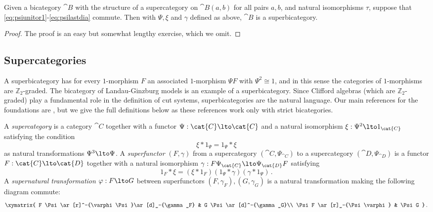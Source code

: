 \begin{lemma}\label{lemma:constructingsuper}
Given a bicategory $\cat{B}$ with the structure of a supercategory on $\cat{B}(a,b)$ for all pairs $a,b$, and natural isomorphisms $\tau$, suppose that \eqref{eq:psiunitor1}-\eqref{eq:psilastdia} commute. Then with $\Psi, \xi$ and $\gamma$ defined as above, $\cat{B}$ is a superbicategory.
\end{lemma}
\begin{proof}
The proof is an easy but somewhat lengthy exercise, which we omit.
\end{proof}

\subsection{Supercategories}

A superbicategory has for every $1$-morphism $F$ an associated $1$-morphism $\Psi F$ with $\Psi^2 \cong 1$, and in this sense the categories of $1$-morphisms are $\mathbb{Z}_2$-graded. The bicategory of Landau-Ginzburg models is an example of a superbicategory. Since Clifford algebras (which are $\mathbb{Z}_2$-graded) play a fundamental role in the definition of cut systems, superbicategories are the natural language. Our main references for the foundations are \cite{ellis_lauda,kang,kang2}, but we give the full definitions below as these references work only with strict bicategories.

\begin{definition} A \emph{supercategory} is a category $\cat{C}$ together with a functor $\Psi: \cat{C} \lto \cat{C}$ and a natural isomorphism $\xi: \Psi^2 \lto 1_{\cat{C}}$ satisfying the condition
\[
\xi * 1_{\Psi} = 1_{\Psi} * \xi
\]
as natural transformations $\Psi^3 \lto \Psi$. A \emph{superfunctor} $(F, \gamma)$ from a supercategory $(\cat{C}, \Psi_{\cat{C}})$ to a supercategory $(\cat{D}, \Psi_{\cat{D}})$ is a functor $F: \cat{C} \lto \cat{D}$ together with a natural isomorphism $\gamma: F \Psi_{\cat{C}} \lto \Psi_{\cat{D}} F$ satisfying
\[
1_F * \xi = (\xi * 1_F ) ( 1_{\Psi} * \gamma ) ( \gamma * 1_{\Psi} )\,.
\]
A \emph{supernatural transformation} $\varphi: F \lto G$ between superfunctors $(F,\gamma_F), (G,\gamma_G)$ is a natural transformation making the following diagram commute:
\[
\xymatrix{
F \Psi \ar[r]^-{\varphi \Psi}\ar[d]_-{\gamma_F} & G \Psi \ar[d]^-{\gamma_G}\\
\Psi F \ar[r]_-{\Psi \varphi} & \Psi G
}\,.
\] 
\end{definition}

